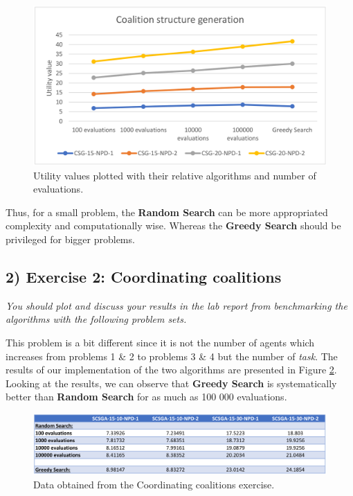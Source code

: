\documentclass[10pt]{article}
\begin{document}
 \begin{figure}[ht!]
 \includegraphics[width=\linewidth]{csg_graph.png}
 \caption{Utility values plotted with their relative algorithms and number of evaluations.}
 \label{fig:csg_graph}
 \end{figure}

 Thus, for a small problem, the \textbf{Random Search} can be more appropriated complexity
  and computationally wise. Whereas the \textbf{Greedy Search} should be privileged for
  bigger problems.

\subsection*{2) \textbf{ Exercise 2: Coordinating coalitions}}
\textit {You should plot and discuss your results in the lab report from
 benchmarking the algorithms with the following problem sets.} \medskip

 This problem is a bit different since it is not the number of agents which increases from
  problems 1 \& 2 to problems 3 \& 4 but the number of \emph{task}. The results of our 
  implementation of the two algorithms are presented in Figure \ref{fig:scsga_data}.
  Looking at the results, we can observe that \textbf{Greedy Search} is systematically
  better than \textbf{Random Search} for as much as 100 000 evaluations.

 \begin{figure}[ht!]
 \includegraphics[width=\linewidth]{scsga_data.png}
 \caption{Data obtained from the Coordinating coalitions exercise.}
 \label{fig:scsga_data}
 \end{figure}
\end{document}
